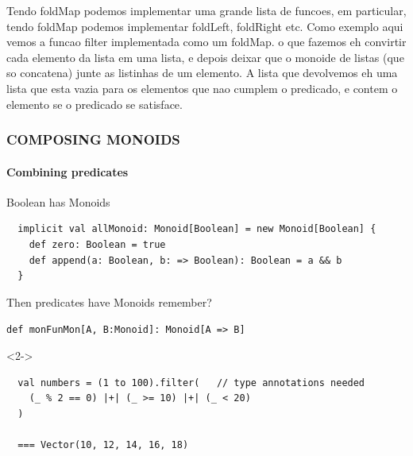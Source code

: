 \documentclass{beamer}
\begin{document}
\begin{frame}[fragile]
{    Tendo foldMap podemos implementar uma grande lista de funcoes, em
    particular, tendo foldMap podemos implementar foldLeft, foldRight etc. Como
    exemplo aqui vemos a funcao filter implementada como um foldMap. o que
    fazemos eh convirtir cada elemento da lista em uma lista, e depois deixar
    que o monoide de listas (que so concatena) junte as listinhas de um
    elemento. A lista que devolvemos eh uma lista que esta vazia para os
    elementos que nao cumplem o predicado, e contem o elemento se o predicado se satisface.
  }
\end{frame}


\begin{frame}[fragile] \frametitle{COMPOSING MONOIDS}
  \framesubtitle{Combining predicates}
  \begin{block}{Boolean has Monoids}
  \begin{lstlisting}
  implicit val allMonoid: Monoid[Boolean] = new Monoid[Boolean] {
    def zero: Boolean = true
    def append(a: Boolean, b: => Boolean): Boolean = a && b
  }
  \end{lstlisting}
  \end{block}

    Then predicates have Monoids remember?

    \texttt{def monFunMon[A, B:Monoid]: Monoid[A => B]}

  \begin{visibleenv}<2->
  \begin{block}{}
  \begin{lstlisting}
  val numbers = (1 to 100).filter(   // type annotations needed
    (_ % 2 == 0) |+| (_ >= 10) |+| (_ < 20)
  )

  === Vector(10, 12, 14, 16, 18)
  \end{lstlisting}
  \end{block}
  \end{visibleenv}
\end{frame}
\end{document}
